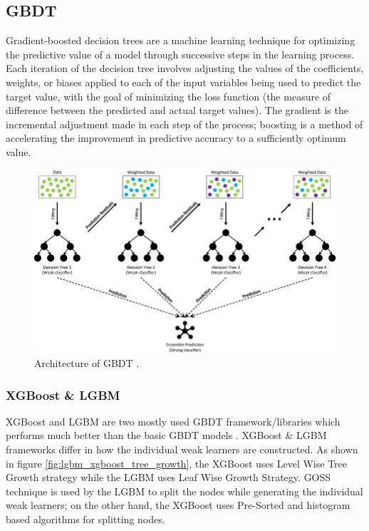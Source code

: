 \documentclass[twoside,11pt,a4paper]{article}
\begin{document}
\subsection{\acf{GBDT}}
Gradient-boosted decision trees are a machine learning technique for optimizing the predictive value of a model through successive steps in the learning process. Each iteration of the decision tree involves adjusting the values of the coefficients, weights, or biases applied to each of the input variables being used to predict the target value, with the goal of minimizing the loss function (the measure of difference between the predicted and actual target values). The gradient is the incremental adjustment made in each step of the process; boosting is a method of accelerating the improvement in predictive accuracy to a sufficiently optimum value.\\
\begin{figure}[ht]
	\centering
	\includegraphics[width=1\textwidth]{gbdt}
	\caption[Architecture of \acf{GBDT}]{Architecture of \acf{GBDT} \cite{deng2021ensemble}.}
	\label{fig:gbdt}
\end{figure}
\FloatBarrier
\subsubsection{\acf{XGBoost} \& \acf{LGBM}} \label{sec:xgboost_lgbm}
\acf{XGBoost}\citep{chen2016xgboost} and \acf{LGBM}\citep{ke2017lightgbm} are two mostly used \acf{GBDT} framework/libraries which performs much better than the basic \acs{GBDT} models \citep{machado2019lightgbm}. \acf{XGBoost} \& \acs{LGBM} frameworks differ in how the individual weak learners are constructed. As shown in figure \ref{fig:lgbm_xgboost_tree_growth}, the \acs{XGBoost} uses Level Wise Tree Growth strategy while the \acs{LGBM} uses Leaf Wise Growth Strategy. \acf{GOSS} technique is used by the \acs{LGBM} to split the nodes while generating the individual weak learners; on the other hand, the \acs{XGBoost} uses Pre-Sorted and histogram based algorithms for splitting nodes.\\
\end{document}
